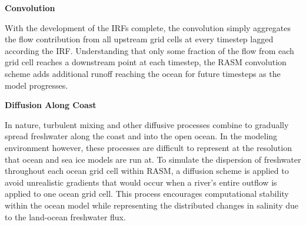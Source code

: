 \textbf{Convolution}

With the development of the IRFs complete, the convolution simply aggregates the flow contribution from all upstream grid cells at every timestep lagged according the IRF.  Understanding that only some fraction of the flow from each grid cell reaches a downstream point at each timestep, the RASM convolution scheme adds additional runoff reaching the ocean for future timesteps as the model progresses.

\textbf{Diffusion Along Coast}

In nature, turbulent mixing and other diffusive processes combine to gradually spread freshwater along the coast and into the open ocean.  In the modeling environment however, these processes are difficult to represent at the resolution that ocean and sea ice models are run at.  To simulate the dispersion of freshwater throughout each ocean grid cell within RASM, a diffusion scheme is applied to avoid unrealistic gradients that would occur when a river’s entire outflow is applied to one ocean grid cell.  This process encourages computational stability within the ocean model while representing the distributed changes in salinity due to the land-ocean freshwater flux.  
  
  
  
  
  